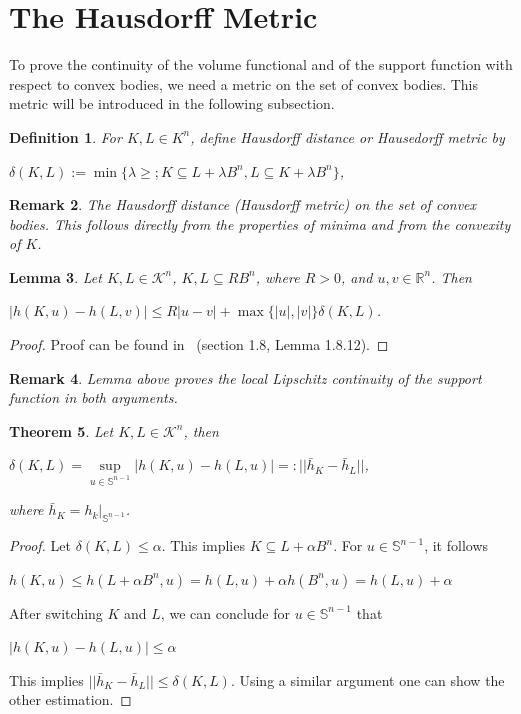 \documentclass[a4paper]{book}
\newtheorem{theorem}{Theorem}%
\newtheorem{lemma}[theorem]{Lemma}%
\newtheorem{remark}[theorem]{Remark}%
\newtheorem{definition}[theorem]{Definition}%
\numberwithin{theorem}{section}%
\begin{document}
\section{The Hausdorff Metric}
To prove the continuity of the volume functional and of the support function with respect to convex bodies, we need a metric on the set of convex bodies. This metric will be introduced in the following subsection.

\begin{definition}
    For $K,L\in K^{n}$, define Hausdorff distance or Hausedorff metric by
    \begin{center}
        $\delta(K,L):=\min\{\lambda\geq;K\subseteq L+\lambda B^{n},L\subseteq K+\lambda B^{n}\}$,
    \end{center}
\end{definition}

\begin{remark}
    The Hausdorff distance (Hausdorff metric) on the set of convex bodies. This follows directly from the properties of minima and from the convexity of $K$.
\end{remark}

\begin{lemma}
    Let $K,L\in\mathscr{K}^{n}$, $K,L\subseteq RB^{n}$, where $R>0$, and $u,v\in\mathbb{R}^{n}$. Then
    \begin{center}
        $|h(K,u)-h(L,v)|\leq R|u-v|+\max\{|u|,|v|\}\delta(K,L)$.
    \end{center}
\end{lemma}
\begin{proof}
    Proof can be found in~\citep{schneider2014convex} (section 1.8, Lemma 1.8.12).
\end{proof}

\begin{remark}
    Lemma above proves the local Lipschitz continuity of the support function in both arguments.
\end{remark}

\begin{theorem}
    Let $K,L\in\mathscr{K}^{n}$, then
    \begin{center}
        $\delta(K,L)=\underset{u\in\mathbb{S}^{n-1}}{\sup}|h(K,u)-h(L,u)|=:||\bar{h}_{K}-\bar{h}_{L}||$,
    \end{center}
    where $\displaystyle \bar{h}_{K}=h_{k}|_{\mathbb{S}^{n-1}}$.
\end{theorem}
\begin{proof}
    Let $\delta(K,L)\leq\alpha$. This implies $K\subseteq L+\alpha B^{n}$. For $u\in\mathbb{S}^{n-1}$, it follows 
    \begin{center}
        $h(K,u)\leq h(L+\alpha B^{n},u)=h(L,u)+\alpha h(B^{n},u)=h(L,u)+\alpha$
    \end{center}
    After switching $K$ and $L$, we can conclude for $u\in\mathbb{S}^{n-1}$ that
    \begin{center}
        $|h(K,u)-h(L,u)|\leq\alpha$
    \end{center}
    This implies $||\bar{h}_{K}-\bar{h}_{L}||\leq\delta(K,L)$. Using a similar argument one can show the other estimation.
\end{proof}
\end{document}
